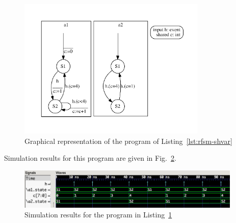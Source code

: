 \begin{figure}
  \centering
\includegraphics[width=0.8\textwidth]{figs/shvar-top} 
  \caption{Graphical representation of the program of Listing~\ref{lst:rfsm-shvar}}
  \label{fig:rfsm-shvar}
\end{figure}

Simulation results for this program are given in Fig.~\ref{fig:rfsm-shvar-vcd}.

\begin{figure}
   \includegraphics[width=0.95\textwidth]{figs/shvar-chrono}
   \centering
  \caption{Simulation results for the program in Listing~\ref{fig:rfsm-shvar}}
  \label{fig:rfsm-shvar-vcd}
\end{figure}


